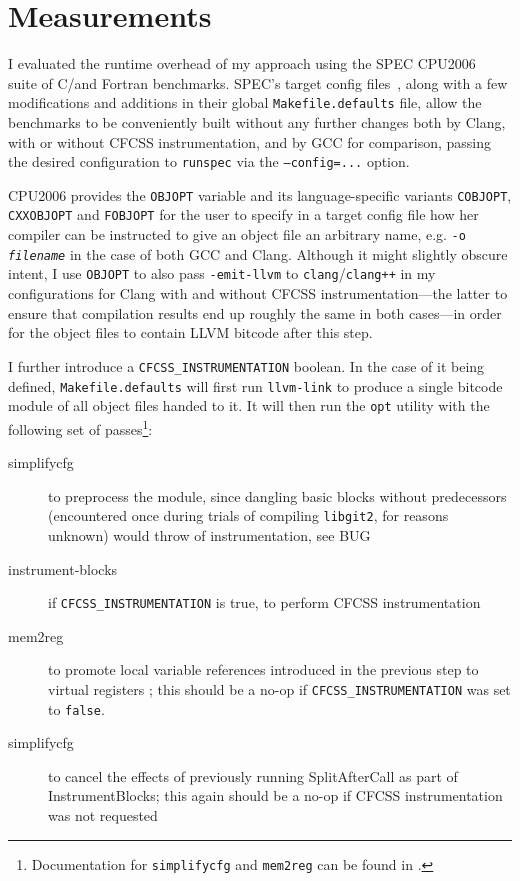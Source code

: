 \section{Measurements}

I evaluated the runtime overhead of my approach using the SPEC
CPU2006~\cite{spec-cpu2006} suite of C/\CPP and Fortran benchmarks. SPEC's
target config files~\cite{spec-cpu2006-config}, along with a few modifications
and additions in their global \texttt{Makefile.defaults} file, allow the
benchmarks to be conveniently built without any further changes both by Clang,
with or without CFCSS instrumentation, and by GCC for comparison, passing the
desired configuration to \texttt{runspec} via the \texttt{--config=...} option.

CPU2006 provides the \texttt{OBJOPT} variable and its language-specific
variants \texttt{COBJOPT}, \texttt{CXXOBJOPT} and \texttt{FOBJOPT} \cite[2.
Items used in Makefile.defaults]{spec-cpu2006-makevars} for the user to specify
in a target config file how her compiler can be instructed to give an object
file an arbitrary name, e.g. \texttt{-o \textit{filename}} in the case of both
GCC and Clang. Although it might slightly
obscure intent, I use \texttt{OBJOPT} to also pass \texttt{-emit-llvm} to
\texttt{clang}/\texttt{clang++} in my configurations for Clang with and without
CFCSS instrumentation—the latter to ensure that compilation results end up
roughly the same in both cases—in order for the object files to contain LLVM
bitcode after this step.

I further introduce a \texttt{CFCSS\_INSTRUMENTATION} boolean. In the case of
it being defined, \texttt{Makefile.defaults} will first run
\texttt{llvm-link} to produce a single bitcode module of all
object files handed to it. It will then run the \texttt{opt} utility with the
following set of passes\footnote{Documentation for \texttt{simplifycfg} and
\texttt{mem2reg} can be found in \cite{llvm-passes}.}:

\begin{description}
  \item[simplifycfg] \cite[simplifycfg]{llvm-passes} to preprocess the module,
    since dangling basic blocks without predecessors (encountered once during
    trials of compiling \texttt{libgit2}, for reasons unknown) would throw of
    instrumentation, see BUG
  \item[instrument-blocks] if \texttt{CFCSS\_INSTRUMENTATION} is true, to
    perform CFCSS instrumentation
  \item[mem2reg] to promote local variable references introduced in the
    previous step to virtual registers \cite[mem2reg]{llvm-passes}; this
    should be a no-op if \texttt{CFCSS\_INSTRUMENTATION}
    was set to \texttt{false}.
  \item[simplifycfg] to cancel the effects of previously
    running SplitAfterCall as part of InstrumentBlocks; this again should be
    a no-op if CFCSS instrumentation was not requested
\end{description}

